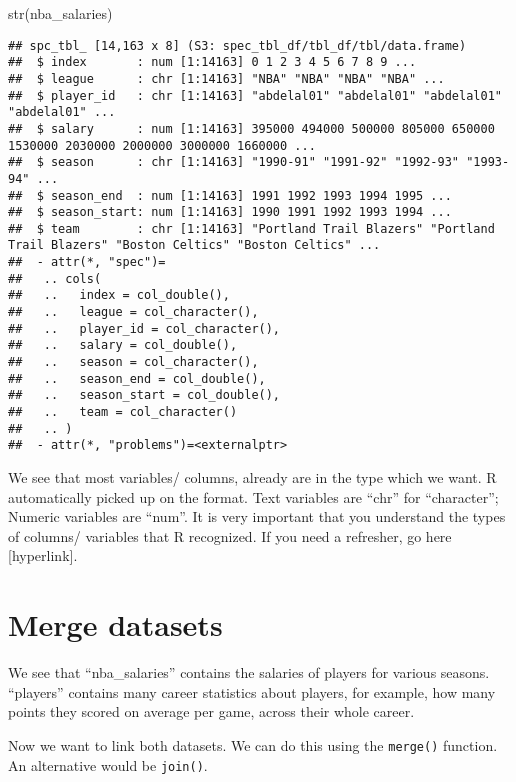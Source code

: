 \documentclass[
]{book}
\newenvironment{Shaded}{\begin{snugshade}}{\end{snugshade}}
\newcommand{\FunctionTok}[1]{\textcolor[rgb]{0.00,0.00,0.00}{#1}}
\newcommand{\FunctionTok}[1]{\textcolor[rgb]{0.13,0.29,0.53}{\textbf{#1}}}
\newcommand{\NormalTok}[1]{#1}
\begin{document}
\begin{Shaded}
\begin{Highlighting}[]
\FunctionTok{str}\NormalTok{(nba\_salaries)}
\end{Highlighting}
\end{Shaded}

\begin{verbatim}
## spc_tbl_ [14,163 x 8] (S3: spec_tbl_df/tbl_df/tbl/data.frame)
##  $ index       : num [1:14163] 0 1 2 3 4 5 6 7 8 9 ...
##  $ league      : chr [1:14163] "NBA" "NBA" "NBA" "NBA" ...
##  $ player_id   : chr [1:14163] "abdelal01" "abdelal01" "abdelal01" "abdelal01" ...
##  $ salary      : num [1:14163] 395000 494000 500000 805000 650000 1530000 2030000 2000000 3000000 1660000 ...
##  $ season      : chr [1:14163] "1990-91" "1991-92" "1992-93" "1993-94" ...
##  $ season_end  : num [1:14163] 1991 1992 1993 1994 1995 ...
##  $ season_start: num [1:14163] 1990 1991 1992 1993 1994 ...
##  $ team        : chr [1:14163] "Portland Trail Blazers" "Portland Trail Blazers" "Boston Celtics" "Boston Celtics" ...
##  - attr(*, "spec")=
##   .. cols(
##   ..   index = col_double(),
##   ..   league = col_character(),
##   ..   player_id = col_character(),
##   ..   salary = col_double(),
##   ..   season = col_character(),
##   ..   season_end = col_double(),
##   ..   season_start = col_double(),
##   ..   team = col_character()
##   .. )
##  - attr(*, "problems")=<externalptr>
\end{verbatim}

We see that most variables/ columns, already are in the type which we want. R automatically picked up on the format. Text variables are ``chr'' for ``character''; Numeric variables are ``num''. It is very important that you understand the types of columns/ variables that R recognized. If you need a refresher, go here {[}hyperlink{]}.

\hypertarget{merge-datasets}{%
\section{Merge datasets}\label{merge-datasets}}

We see that ``nba\_salaries'' contains the salaries of players for various seasons.
``players'' contains many career statistics about players, for example, how many points they scored on average per game, across their whole career.

Now we want to link both datasets. We can do this using the \texttt{merge()} function.
An alternative would be \texttt{join()}.
\end{document}
